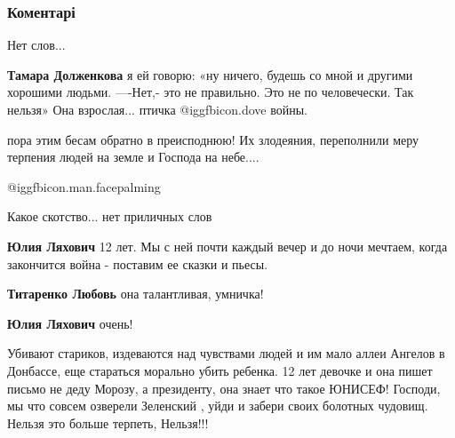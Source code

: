  
 
 
 
 
\subsubsection{Коментарі}

\begin{itemize} %
Нет слов...

\begin{itemize} %
\textbf{Тамара Долженкова}
я ей говорю: «ну ничего, будешь со мной и другими хорошими людьми.
—-Нет,- это не правильно. Это не по человечески.
Так нельзя»
Она взрослая... птичка @igg{fbicon.dove} войны.
\end{itemize} %


пора этим бесам обратно в преисподнюю! Их злодеяния, переполнили меру терпения
людей на земле и Господа на небе....

 @igg{fbicon.man.facepalming} 


Какое скотство... нет приличных слов

\begin{itemize} %
\textbf{Юлия Ляхович} 12 лет. Мы с ней почти каждый вечер и до ночи мечтаем, когда закончится война - поставим ее сказки и пьесы.

\textbf{Титаренко Любовь} она талантливая, умничка!

\textbf{Юлия Ляхович} очень!


Убивают стариков, издеваются над чувствами людей и им мало аллеи Ангелов в
Донбассе, еще стараться морально убить ребенка. 12 лет девочке и она пишет
письмо не деду Морозу, а президенту, она знает что такое ЮНИСЕФ! Господи, мы
что совсем озверели Зеленский , уйди и забери своих болотных чудовищ. Нельзя
это больше терпеть, Нельзя!!!


\end{itemize}
\end{itemize}
